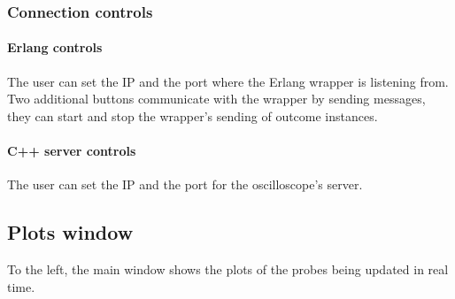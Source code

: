    \subsubsection{Connection controls}
    
        \paragraph{Erlang controls}
            The user can set the IP and the port where the Erlang wrapper is listening from. Two additional buttons communicate with the wrapper by sending messages, they can start and stop the wrapper's sending of outcome instances.
        
        \paragraph{C++ server controls}
            The user can set the IP and the port for the oscilloscope's server.

\subsection{Plots window}
        To the left, the main window shows the plots of the probes being updated in real time. 
